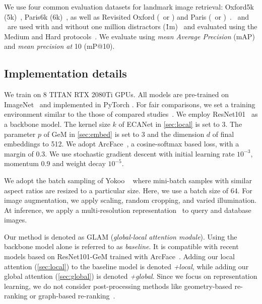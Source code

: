We use four common evaluation datasets for landmark image retrieval: Oxford5k (\oxf5k)~\cite{Philbin01}, Paris6k (\paris6k)~\cite{Philbin02}, as well as Revisited Oxford (\roxf~or \rox) and Paris (\rpar~or \rpa)~\cite{RITAC18}. \roxf~and \rpar~are used with and without one million distractors (\r1m)~\cite{Ng01} and evaluated using the Medium and Hard protocols~\cite{RITAC18}. We evaluate using \emph{mean Average Precision} (mAP) and \emph{mean precision at} 10 (mP@10).


\subsection{Implementation details}

We train on 8 TITAN RTX 2080Ti GPUs. All models are pre-trained on ImageNet~\cite{Russakovsky01} and implemented in PyTorch \cite{Paszke01}. For fair comparisons, we set a training environment similar to the those  of compared studies~\cite{Yokoo01, Weyand01, Ng01, RITAC18}. We employ ResNet101~\cite{Zhang01} as a backbone model. The kernel size $k$ of ECANet in \autoref{sec:local} is set to 3. The parameter $p$ of GeM in \autoref{sec:embed} is set to 3 and the dimension $d$ of final embeddings to 512. We adopt ArcFace~\cite{Deng01}, a cosine-softmax based loss, with a margin of 0.3. We use stochastic gradient descent with initial learning rate $10^{-3}$, momentum 0.9 and weight decay $10^{-5}$.

We adopt the batch sampling of Yokoo \etal~\cite{Yokoo01} where mini-batch samples with similar aspect ratios are resized to a particular size. Here, we use a batch size of 64. For image augmentation, we apply scaling, random cropping, and varied illumination. At inference, we apply a multi-resolution representation~\cite{Gordo01} to query and database images.

Our method is denoted as GLAM (\emph{global-local attention module}). Using the backbone model alone is referred to as \emph{baseline}. It is compatible with recent models based on ResNet101-GeM trained with ArcFace~\cite{Weyand01, Ng01}. Adding our local attention (\autoref{sec:local}) to the baseline model is denoted \emph{+local}, while adding our global attention (\autoref{sec:global}) is denoted \emph{+global}. Since we focus on representation learning, we do not consider post-processing methods like geometry-based re-ranking \cite{Noh01, simeoni2019local, Weyand01} or graph-based re-ranking~\cite{Donoser01, iscen2017efficient, Yang01}.

